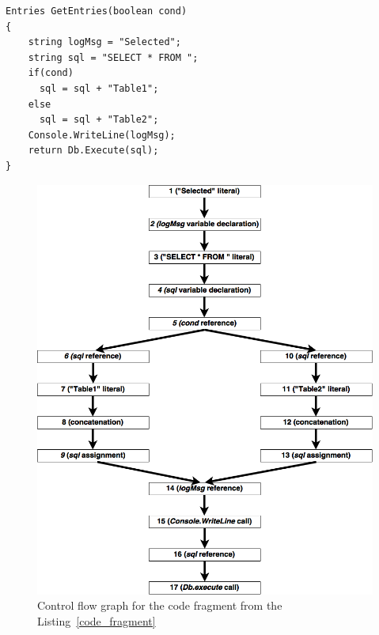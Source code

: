 \begin{lstlisting}[label=code_fragment,caption=C\# code fragment]
Entries GetEntries(boolean cond) 
{
    string logMsg = "Selected";
    string sql = "SELECT * FROM ";
    if(cond)
      sql = sql + "Table1";
    else
      sql = sql + "Table2";
    Console.WriteLine(logMsg);
    return Db.Execute(sql);
}
\end{lstlisting}


\begin{figure}[h!]
    \begin{center}
        \includegraphics[scale=0.3]{Figures/Flow_graph.png}
    \end{center}
    \caption{Control flow graph for the code fragment from the Listing~\ref{code_fragment}}
    \label{flow_graph_pic}
\end{figure} 


